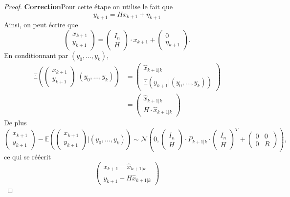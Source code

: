 \documentclass[a4paper,12pt]{book}
\newcommand{\E}{\mathbb{E}}
\begin{document}
\begin{proof}
\textbf{Correction}Pour cette étape on utilise le fait que $$y_{k+1}=Hx_{k+1}+\eta_{k+1}$$
Ainsi, on peut écrire que $$\left(\begin{array}{c}
x_{k+1}\\
y_{k+1}
\end{array} \right)=\left( \begin{array}{c}
I_n\\
H
\end{array}\right)\cdot x_{k+1}+\left(\begin{array}{c}
0\\
\eta_{k+1}
\end{array} \right).$$
En conditionnant par $(y_0,\ldots,y_{k})$,
\begin{align*}
\E\left(
\begin{pmatrix}
x_{k+1}\\y_{k+1}
\end{pmatrix} |(y_0,\ldots,y_{k}) \right)
& = \begin{pmatrix}\hat{x}_{k+1|k}\\ \E (y_{k+1}| (y_0,\ldots,y_{k}))\end{pmatrix} \\
&=\begin{pmatrix}
\hat{x}_{k+1|k}\\
H\cdot \hat{x}_{k+1|k}
\end{pmatrix}
\end{align*}
De plus
\[\begin{pmatrix}
x_{k+1}\\
y_{k+1}
\end{pmatrix} -\E\left(
\begin{pmatrix}
x_{k+1}\\
y_{k+1}
\end{pmatrix} |(y_0,\ldots,y_{k}) \right) \sim \mathcal{N} \left( 0, \left(\begin{array}{c}
I_n\\
H
\end{array}\right)\cdot P_{k+1|k} \cdot  \left(\begin{array}{c}
I_n\\
H
\end{array}\right)^T +\left(\begin{array}{cc}
0&0\\
0&R
\end{array}\right) \right),\]
ce qui se réécrit
\[\begin{pmatrix}
x_{k+1}-\hat{x}_{k+1|k}\\
y_{k+1}-H\hat{x}_{k+1|k}
\end{pmatrix}
\]
\end{proof}
\end{document}
